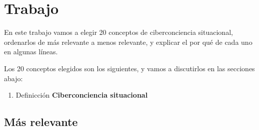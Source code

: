 \chapter{Trabajo}


En este trabajo vamos a elegir 20 conceptos de ciberconciencia situacional, ordenarlos de más relevante a menos relevante, y explicar el por qué de cada uno en algunas líneas.

Los 20 conceptos elegidos son los siguientes, y vamos a discutirlos en las secciones abajo:
\begin{enumerate}
   \item Definicción \textbf{Ciberconciencia situacional}
\end{enumerate}

\section{Más relevante}

